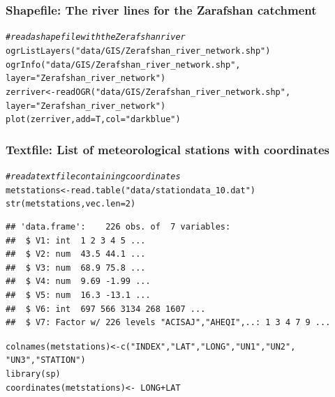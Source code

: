 \documentclass[xcolor=table, xcolor=dvipsnames]{beamer}\usepackage[]{graphicx}\usepackage[]{color}
\makeatletter
\newcommand{\hlnum}[1]{\textcolor[rgb]{0,0,0}{#1}}
\newcommand{\hlstr}[1]{\textcolor[rgb]{0.545,0.137,0.137}{#1}}
\newcommand{\hlcom}[1]{\textcolor[rgb]{0,0.392,0}{\textit{#1}}}
\newcommand{\hlopt}[1]{\textcolor[rgb]{0,0,0}{#1}}
\newcommand{\hlstd}[1]{\textcolor[rgb]{0,0,0}{#1}}
\newcommand{\hlkwb}[1]{\textcolor[rgb]{0,0,0}{#1}}
\newcommand{\hlkwc}[1]{\textcolor[rgb]{1,0,1}{#1}}
\newcommand{\hlkwd}[1]{\textcolor[rgb]{0,0,1}{#1}}
\newenvironment{kframe}{%
 \def\at@end@of@kframe{}%
 \ifinner\ifhmode%
  \def\at@end@of@kframe{\end{minipage}}%
  \begin{minipage}{\columnwidth}%
 \fi\fi%
 \def\FrameCommand##1{\hskip\@totalleftmargin \hskip-\fboxsep
 \colorbox{shadecolor}{##1}\hskip-\fboxsep
     \hskip-\linewidth \hskip-\@totalleftmargin \hskip\columnwidth}%
 \MakeFramed {\advance\hsize-\width
   \@totalleftmargin\z@ \linewidth\hsize
   \@setminipage}}%
 {\par\unskip\endMakeFramed%
 \at@end@of@kframe}
\newenvironment{knitrout}{}{} %
\makeatother
\begin{document}
\begin{frame}[fragile]\frametitle{Shapefile: The river lines for the Zarafshan catchment}
\begin{knitrout}\small
{}\color{fgcolor}\begin{kframe}
\begin{alltt}
\hlcom{# read a shapefile with the Zerafshan river}
\hlkwd{ogrListLayers}\hlstd{(}\hlstr{"data/GIS/Zerafshan_river_network.shp"}\hlstd{)}
\hlkwd{ogrInfo}\hlstd{(}\hlstr{"data/GIS/Zerafshan_river_network.shp"}\hlstd{,}
        \hlkwc{layer}\hlstd{=}\hlstr{"Zerafshan_river_network"}\hlstd{)}
\hlstd{zerriver} \hlkwb{<-} \hlkwd{readOGR}\hlstd{(}\hlstr{"data/GIS/Zerafshan_river_network.shp"}\hlstd{,}
                    \hlkwc{layer}\hlstd{=}\hlstr{"Zerafshan_river_network"}\hlstd{)}
\hlkwd{plot}\hlstd{(zerriver,} \hlkwc{add}\hlstd{=T,} \hlkwc{col}\hlstd{=}\hlstr{"darkblue"}\hlstd{)}
\end{alltt}
\end{kframe}
\end{knitrout}
\end{frame}


\begin{frame}[fragile]\frametitle{Textfile: List of meteorological stations with coordinates}
\begin{knitrout}\footnotesize
{}\color{fgcolor}\begin{kframe}
\begin{alltt}
\hlcom{# read a textfile containing coordinates}
\hlstd{metstations} \hlkwb{<-} \hlkwd{read.table}\hlstd{(}\hlstr{"data/stationdata_10.dat"}\hlstd{)}
\hlkwd{str}\hlstd{(metstations,} \hlkwc{vec.len}\hlstd{=}\hlnum{2}\hlstd{)}
\end{alltt}
\begin{verbatim}
## 'data.frame':	226 obs. of  7 variables:
##  $ V1: int  1 2 3 4 5 ...
##  $ V2: num  43.5 44.1 ...
##  $ V3: num  68.9 75.8 ...
##  $ V4: num  9.69 -1.99 ...
##  $ V5: num  16.3 -13.1 ...
##  $ V6: int  697 566 3134 268 1607 ...
##  $ V7: Factor w/ 226 levels "ACISAJ","AHEQI",..: 1 3 4 7 9 ...
\end{verbatim}
\begin{alltt}
\hlkwd{colnames}\hlstd{(metstations)} \hlkwb{<-} \hlkwd{c}\hlstd{(}\hlstr{"INDEX"}\hlstd{,} \hlstr{"LAT"}\hlstd{,} \hlstr{"LONG"}\hlstd{,} \hlstr{"UN1"}\hlstd{,} \hlstr{"UN2"}\hlstd{,}
                           \hlstr{"UN3"}\hlstd{,} \hlstr{"STATION"}\hlstd{)}
\hlkwd{library}\hlstd{(sp)}
\hlkwd{coordinates}\hlstd{(metstations)} \hlkwb{<-} \hlopt{~} \hlstd{LONG} \hlopt{+} \hlstd{LAT}
\end{alltt}
\end{kframe}
\end{knitrout}
\end{frame}
\end{document}
